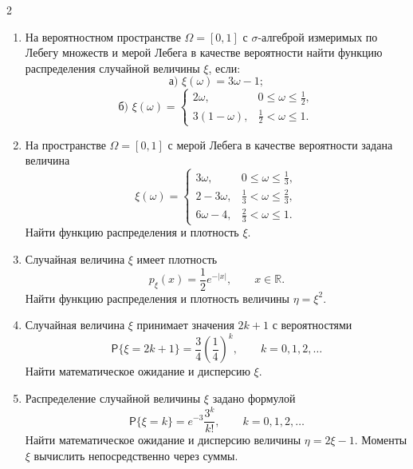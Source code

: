 \documentclass[a4paper,10pt]{article}
\newcommand{\PP}{\mathsf P}
\newcommand{\R}{\mathbb R}
\begin{document}
\begin{multicols}{2}
\begin{enumerate}
\begin{minipage}[t]{\linewidth}
\end{minipage}

\item\begin{minipage}[t]{\linewidth} На вероятностном пространстве $\Omega=[0,1]$ с $\sigma$-алгеброй измеримых по Лебегу множеств и мерой Лебега в качестве вероятности найти функцию распределения случайной величины $\xi$, если:
\[
\text{а) }\xi(\omega)=3\omega-1;
\]
\[
\text{б) }\xi(\omega)=\begin{cases}2\omega,&0\leq\omega\leq\tfrac12,\\3(1-\omega),&\tfrac12<\omega\leq1.\end{cases}
\]

\end{minipage}
\item\begin{minipage}[t]{\linewidth} На пространстве $\Omega=[0,1]$ с мерой Лебега в качестве вероятности задана величина
\[
\xi(\omega)=\begin{cases}3\omega,&0\leq\omega\leq\tfrac13,\\2-3\omega,&\tfrac13<\omega\leq\tfrac23,\\6\omega-4,&\tfrac23<\omega\leq1.\end{cases}
\]
Найти функцию распределения и плотность $\xi$.
\end{minipage}


\item\begin{minipage}[t]{\linewidth} Случайная величина $\xi$ имеет плотность
\[
p_\xi(x)=\frac12e^{-|x|},\qquad x\in\R.
\]
Найти функцию распределения и плотность величины $\eta=\xi^2$.

\end{minipage}

\item\begin{minipage}[t]{\linewidth} Случайная величина $\xi$ принимает значения $2k+1$ с вероятностями
\[
\PP\{\xi=2k+1\}=\frac34\left(\frac14\right)^k,
\qquad k=0,1,2,\ldots
\]
Найти математическое ожидание и дисперсию $\xi$.
\end{minipage}

\item\begin{minipage}[t]{\linewidth} Распределение случайной величины $\xi$ задано формулой
\[
\PP\{\xi=k\}=e^{-3}\frac{3^k}{k!},\qquad k=0,1,2,\ldots
\]
Найти математическое ожидание и дисперсию величины $\eta=2\xi-1$.
Моменты $\xi$ вычислить непосредственно через суммы.


\end{minipage}
\end{enumerate}
\end{multicols}
\end{document}
